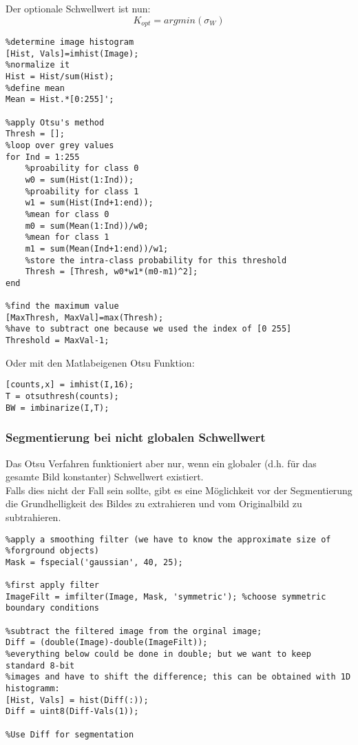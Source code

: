 Der optionale Schwellwert ist nun:
\begin{equation}
K_{opt}=argmin(\sigma_W)
\end{equation}
\begin{lstlisting}
%determine image histogram
[Hist, Vals]=imhist(Image);
%normalize it
Hist = Hist/sum(Hist);
%define mean
Mean = Hist.*[0:255]';

%apply Otsu's method
Thresh = [];
%loop over grey values
for Ind = 1:255
    %proability for class 0
    w0 = sum(Hist(1:Ind));
    %proability for class 1
    w1 = sum(Hist(Ind+1:end));
    %mean for class 0
    m0 = sum(Mean(1:Ind))/w0;
    %mean for class 1
    m1 = sum(Mean(Ind+1:end))/w1;
    %store the intra-class probability for this threshold
    Thresh = [Thresh, w0*w1*(m0-m1)^2];
end

%find the maximum value
[MaxThresh, MaxVal]=max(Thresh);
%have to subtract one because we used the index of [0 255]
Threshold = MaxVal-1;
\end{lstlisting}
Oder mit den Matlabeigenen Otsu Funktion:
\begin{lstlisting}
[counts,x] = imhist(I,16);
T = otsuthresh(counts);
BW = imbinarize(I,T);
\end{lstlisting}
\subsubsection{Segmentierung bei nicht globalen Schwellwert}
Das Otsu Verfahren funktioniert aber nur, wenn ein globaler (d.h. für das gesamte Bild konstanter) Schwellwert existiert.\\
Falls dies nicht der Fall sein sollte, gibt es eine Möglichkeit vor der Segmentierung die Grundhelligkeit des Bildes zu extrahieren und vom Originalbild zu subtrahieren.
\begin{lstlisting}
%apply a smoothing filter (we have to know the approximate size of
%forground objects)
Mask = fspecial('gaussian', 40, 25);

%first apply filter
ImageFilt = imfilter(Image, Mask, 'symmetric'); %choose symmetric boundary conditions

%subtract the filtered image from the orginal image; 
Diff = (double(Image)-double(ImageFilt));
%everything below could be done in double; but we want to keep standard 8-bit
%images and have to shift the difference; this can be obtained with 1D histogramm:  
[Hist, Vals] = hist(Diff(:));
Diff = uint8(Diff-Vals(1));

%Use Diff for segmentation
\end{lstlisting}

